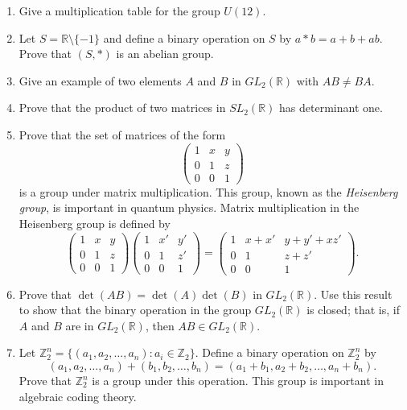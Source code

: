 \documentclass[12pt,reqno]{amsart}
\newcommand{\boldemph}{\emph}
\begin{document}
\begin{enumerate}[{\bf 1.}]
 
\item
Give a multiplication table for the group $U(12)$.
 
 
\item
Let $S = {\mathbb R} \setminus \{ -1 \}$ and define a binary operation on
$S$ by $a \ast b = a + b +ab$. Prove that $(S, \ast)$ is an abelian
group.
 
 
\item
Give an example of two elements $A$ and $B$ in $GL_2({\mathbb R})$ with
$AB \neq BA$.
 
 
\item
Prove that the product of two matrices in $SL_2({\mathbb R})$ has
determinant one.
 
 
\item
Prove that the set of matrices of the form
\[
\begin{pmatrix}
1 & x & y \\
0 & 1 & z \\
0 & 0 & 1
\end{pmatrix}
\]
is a group under matrix multiplication.  This group, known as the
\boldemph{Heisenberg group}, is important in
quantum physics.  Matrix multiplication in the Heisenberg group is
defined by  
\[
\begin{pmatrix}
1 & x & y \\
0 & 1 & z \\
0 & 0 & 1
\end{pmatrix}
\begin{pmatrix}
1 & x' & y' \\
0 & 1 & z' \\
0 & 0 & 1
\end{pmatrix}
=
\begin{pmatrix}
1 & x+x' & y+y'+xz' \\
0 & 1 & z+z' \\
0 & 0 & 1
\end{pmatrix}.
\]
 
 
\item %
Prove that $\det(AB) = \det(A) \det(B)$ in $GL_2({\mathbb R})$. Use this
result to show that the binary operation in the group $GL_2({\mathbb R})$
is closed; that is, if $A$ and $B$ are in $GL_2({\mathbb R})$, then $AB
\in GL_2({\mathbb R})$.
 
 
\item %
Let ${\mathbb Z}_2^n = \{ (a_1, a_2, \ldots, a_n) : a_i \in {\mathbb Z}_2
\}$. Define a binary operation on ${\mathbb Z}_2^n$ by
\[
(a_1, a_2, \ldots, a_n)
+
(b_1, b_2, \ldots, b_n)
=
(a_1+b_1, a_2+b_2, \ldots, a_n+b_n).
\]
Prove that ${\mathbb Z}_2^n$ is a group under this operation. This group
is important in algebraic coding theory. 
 

\end{enumerate}
\end{document}
